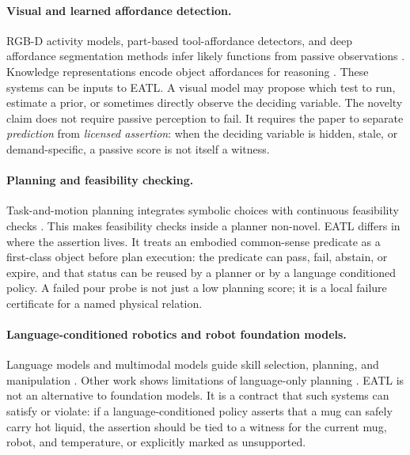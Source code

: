 \documentclass{article}
\begin{document}
\paragraph{Visual and learned affordance detection.}
RGB-D activity models, part-based tool-affordance detectors, and deep
affordance segmentation methods infer likely functions from passive
observations \citep{koppula2013learning,myers2015affordance,do2018affordancenet}.
Knowledge representations encode object affordances for reasoning
\citep{zhu2014reasoning}.  These systems can be inputs to EATL.  A visual model
may propose which test to run, estimate a prior, or sometimes directly observe
the deciding variable.  The novelty claim does not require passive perception
to fail.  It requires the paper to separate \emph{prediction} from
\emph{licensed assertion}: when the deciding variable is hidden, stale, or
demand-specific, a passive score is not itself a witness.

\paragraph{Planning and feasibility checking.}
Task-and-motion planning integrates symbolic choices with continuous
feasibility checks \citep{kaelbling2011hierarchical,toussaint2015logic,garrett2020pddlstream}.
This makes feasibility checks inside a planner non-novel.  EATL differs in
where the assertion lives.  It treats an embodied common-sense predicate as a
first-class object before plan execution: the predicate can pass, fail, abstain,
or expire, and that status can be reused by a planner or by a language
conditioned policy.  A failed pour probe is not just a low planning score; it is
a local failure certificate for a named physical relation.

\paragraph{Language-conditioned robotics and robot foundation models.}
Language models and multimodal models guide skill selection, planning, and
manipulation \citep{ahn2022saycan,huang2022inner,liang2023code,huang2023voxposer,driess2023palme,brohan2022rt1,brohan2023rt2,openx2023,shridhar2022cliport}.
Other work shows limitations of language-only planning
\citep{huang2022zeroshot,valmeekam2023plan}.  EATL is not an alternative to
foundation models.  It is a contract that such systems can satisfy or violate:
if a language-conditioned policy asserts that a mug can safely carry hot
liquid, the assertion should be tied to a witness for the current mug, robot,
and temperature, or explicitly marked as unsupported.
\end{document}
